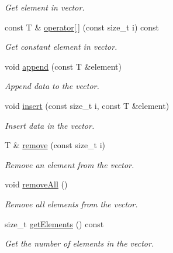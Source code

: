 \begin{DoxyCompactItemize}
\begin{DoxyCompactList}\small\item\em Get element in vector. \item\end{DoxyCompactList}\item 
const T \& \hyperlink{classPandora_1_1Utils_1_1Vector_a9841fe5df9567810a8be69891e5bf5cf}{operator\mbox{[}$\,$\mbox{]}} (const size\_\-t i) const 
\begin{DoxyCompactList}\small\item\em Get constant element in vector. \item\end{DoxyCompactList}\item 
void \hyperlink{classPandora_1_1Utils_1_1Vector_a6c1c963c1d58b1e371a07c048c33cdca}{append} (const T \&element)
\begin{DoxyCompactList}\small\item\em Append data to the vector. \item\end{DoxyCompactList}\item 
void \hyperlink{classPandora_1_1Utils_1_1Vector_a8757e06ea29132d0b8873a13b6c1d956}{insert} (const size\_\-t i, const T \&element)
\begin{DoxyCompactList}\small\item\em Insert data in the vector. \item\end{DoxyCompactList}\item 
T \& \hyperlink{classPandora_1_1Utils_1_1Vector_a321442d5b814dd8709319ad109af1700}{remove} (const size\_\-t i)
\begin{DoxyCompactList}\small\item\em Remove an element from the vector. \item\end{DoxyCompactList}\item 
void \hyperlink{classPandora_1_1Utils_1_1Vector_ab9f631b7ca468cba7f358ee14043b0a6}{removeAll} ()
\begin{DoxyCompactList}\small\item\em Remove all elements from the vector. \item\end{DoxyCompactList}\item 
size\_\-t \hyperlink{classPandora_1_1Utils_1_1Vector_a4d21fd9aff673df56471a9724b36fe2c}{getElements} () const 
\begin{DoxyCompactList}\small\item\em Get the number of elements in the vector. \item\end{DoxyCompactList}\item 

\end{DoxyCompactItemize}

